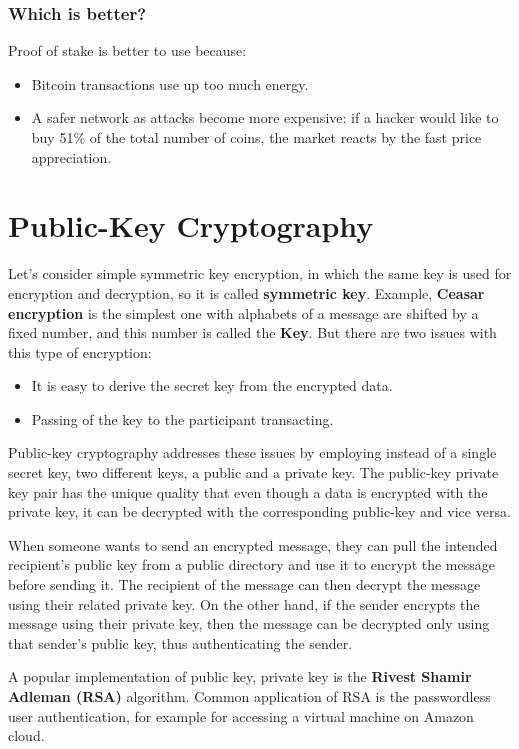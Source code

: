 \documentclass{article}
\begin{document}
\subsubsection{Which is better?}
Proof of stake is better to use because:
\begin{itemize}
    \item Bitcoin transactions use up too much energy.
    \item A safer network as attacks become more expensive: if a hacker would like to buy 51\% of the total number of coins, the market reacts by the fast price appreciation.
\end{itemize}
\section{Public-Key Cryptography}
Let's consider simple symmetric key encryption, in which the same key is used for encryption and decryption, so it is called \textbf{symmetric key}. Example, \textbf{Ceasar encryption} is the simplest one with alphabets of a message are shifted by a fixed number, and this number is called the \textbf{Key}. But there are two issues with this type of encryption: 
\begin{itemize}
    \item It is easy to derive the secret key from the encrypted data.
    \item Passing of the key to the participant transacting.
\end{itemize}
Public-key cryptography addresses these issues by employing instead of a single secret key, two different keys, a public and a private key. The public-key private key pair has the unique quality that even though a data is encrypted with the private key, it can be decrypted with the corresponding public-key and vice versa. \par
When someone wants to send an encrypted message, they can pull the intended recipient's public key from a public directory and use it to encrypt the message before sending it. The recipient of the message can then decrypt the message using their related private key. On the other hand, if the sender encrypts the message using their private key, then the message can be decrypted only using that sender's public key, thus authenticating the sender.\\ \par
A popular implementation of public key, private key is the \textbf{Rivest Shamir Adleman (RSA)} algorithm. Common application of RSA is the passwordless user authentication, for example for accessing a virtual machine on Amazon cloud.\par
\end{document}
